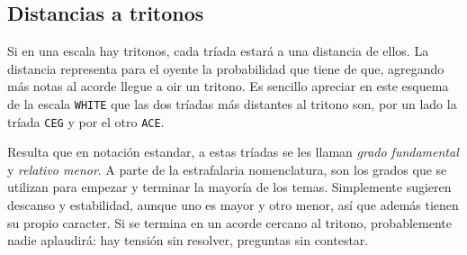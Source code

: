 \documentclass[]{article}
\begin{document}
\subsection{Distancias a tritonos}

Si en una escala hay tritonos, cada tríada estará a una distancia de ellos. La distancia representa para el oyente la probabilidad que tiene de que, agregando más notas al acorde llegue a oir un tritono. Es sencillo apreciar en este esquema de la escala \texttt{WHITE} que las dos tríadas más distantes al tritono son, por un lado la tríada \texttt{CEG} y por el otro \texttt{ACE}.

Resulta que en notación estandar, a estas tríadas se les llaman \emph{grado fundamental} y \emph{relativo menor}. A parte de la estrafalaria nomenclatura, son los grados que se utilizan para empezar y terminar la mayoría de los temas. Simplemente sugieren descanso y estabilidad, aunque uno es mayor y otro menor, así que además tienen su propio caracter. Si se termina en un acorde cercano al tritono, probablemente nadie aplaudirá: hay tensión sin resolver, preguntas sin contestar.
\end{document}
